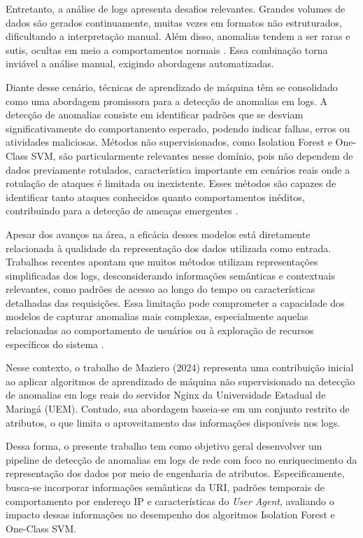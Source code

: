 \documentclass[12pt,a4paper]{report}
\begin{document}
Entretanto, a análise de logs apresenta desafios relevantes. Grandes volumes de dados são gerados continuamente, muitas vezes em formatos não estruturados, dificultando a interpretação manual. Além disso, anomalias tendem a ser raras e sutis, ocultas em meio a comportamentos normais \cite{hussein2024}. Essa combinação torna inviável a análise manual, exigindo abordagens automatizadas.

Diante desse cenário, técnicas de aprendizado de máquina têm se consolidado como uma abordagem promissora para a detecção de anomalias em logs. A detecção de anomalias consiste em identificar padrões que se desviam significativamente do comportamento esperado, podendo indicar falhas, erros ou atividades maliciosas. Métodos não supervisionados, como Isolation Forest e One-Class SVM, são particularmente relevantes nesse domínio, pois não dependem de dados previamente rotulados, característica importante em cenários reais onde a rotulação de ataques é limitada ou inexistente. Esses métodos são capazes de identificar tanto ataques conhecidos quanto comportamentos inéditos, contribuindo para a detecção de ameaças emergentes \cite{komadina2024}.

Apesar dos avanços na área, a eficácia desses modelos está diretamente relacionada à qualidade da representação dos dados utilizada como entrada. Trabalhos recentes apontam que muitos métodos utilizam representações simplificadas dos logs, desconsiderando informações semânticas e contextuais relevantes, como padrões de acesso ao longo do tempo ou características detalhadas das requisições. Essa limitação pode comprometer a capacidade dos modelos de capturar anomalias mais complexas, especialmente aquelas relacionadas ao comportamento de usuários ou à exploração de recursos específicos do sistema \cite{chen2024semantic}.

Nesse contexto, o trabalho de Maziero (2024) representa uma contribuição inicial ao aplicar algoritmos de aprendizado de máquina não supervisionado na detecção de anomalias em logs reais do servidor Nginx da Universidade Estadual de Maringá (UEM). Contudo, sua abordagem baseia-se em um conjunto restrito de atributos, o que limita o aproveitamento das informações disponíveis nos logs.

Dessa forma, o presente trabalho tem como objetivo geral desenvolver um pipeline de detecção de anomalias em logs de rede com foco no enriquecimento da representação dos dados por meio de engenharia de atributos. Especificamente, busca-se incorporar informações semânticas da URI, padrões temporais de comportamento por endereço IP e características do \textit{User Agent}, avaliando o impacto dessas informações no desempenho dos algoritmos Isolation Forest e One-Class SVM.
\end{document}
